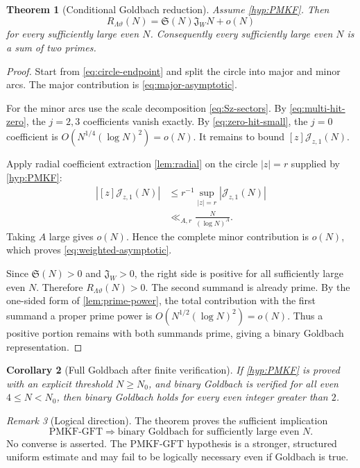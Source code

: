 \documentclass[11pt]{article}
\newtheorem{theorem}{Theorem}[section]
\newtheorem{corollary}[theorem]{Corollary}
\theoremstyle{definition}
\theoremstyle{remark}
\newtheorem{remark}[theorem]{Remark}
\newcommand{\1}{\mathbf 1}
\newcommand{\SG}{\mathfrak S}
\newcommand{\PMKF}{\mathrm{PMKF}\text{-}\mathrm{GFT}}
\begin{document}
\begin{theorem}[Conditional Goldbach reduction]\label{thm:PMKF-implies-Goldbach}
Assume \cref{hyp:PMKF}.  Then
\begin{equation}\label{eq:weighted-asymptotic}
R_{\Lambda\vartheta}(N)
=
\SG(N)\mathfrak J_W N+o(N)
\end{equation}
for every sufficiently large even $N$.  Consequently every sufficiently large even $N$ is a sum of two primes.
\end{theorem}

\begin{proof}
Start from \eqref{eq:circle-endpoint} and split the circle into major and minor arcs.  The major contribution is \eqref{eq:major-asymptotic}.

For the minor arcs use the scale decomposition \eqref{eq:Sz-sectors}.  By \eqref{eq:multi-hit-zero}, the $j=2,3$ coefficients vanish exactly.  By \eqref{eq:zero-hit-small}, the $j=0$ coefficient is $O(N^{1/4}(\log N)^2)=o(N)$.  It remains to bound $[z]\mathcal J_{z,1}(N)$.

Apply radial coefficient extraction \cref{lem:radial} on the circle $|z|=r$ supplied by \cref{hyp:PMKF}:
\begin{align*}
|[z]\mathcal J_{z,1}(N)|
&\le
r^{-1}\sup_{|z|=r}|\mathcal J_{z,1}(N)|\\
&\ll_{A,r}
\frac{N}{(\log N)^A}.
\end{align*}
Taking $A$ large gives $o(N)$.  Hence the complete minor contribution is $o(N)$, which proves \eqref{eq:weighted-asymptotic}.

Since $\SG(N)>0$ and $\mathfrak J_W>0$, the right side is positive for all sufficiently large even $N$.  Therefore $R_{\Lambda\vartheta}(N)>0$.  The second summand is already prime.  By the one-sided form of \cref{lem:prime-power}, the total contribution with the first summand a proper prime power is $O(N^{1/2}(\log N)^2)=o(N)$.  Thus a positive portion remains with both summands prime, giving a binary Goldbach representation.
\end{proof}

\begin{corollary}[Full Goldbach after finite verification]\label{cor:finite}
If \cref{hyp:PMKF} is proved with an explicit threshold $N\ge N_0$, and binary Goldbach is verified for all even $4\le N<N_0$, then binary Goldbach holds for every even integer greater than $2$.
\end{corollary}

\begin{remark}[Logical direction]
The theorem proves the sufficient implication
\[
\PMKF\Longrightarrow\text{binary Goldbach for sufficiently large even }N.
\]
No converse is asserted.  The $\PMKF$ hypothesis is a stronger, structured uniform estimate and may fail to be logically necessary even if Goldbach is true.
\end{remark}
\end{document}
